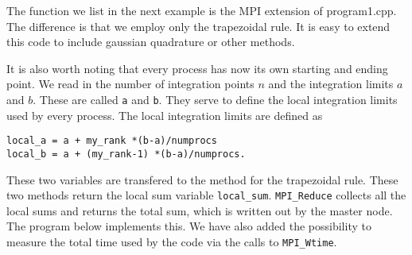 The function we list in the next example is the MPI extension of program1.cpp.  The difference is that we employ only the trapezoidal
rule. It is easy to extend this code to include gaussian quadrature or other methods.

It is also worth noting that every process has now its own starting and ending point. 
We read in the number of integration points $n$ and the integration limits $a$ and $b$. These are called
\lstinline{a} and \lstinline{b}.
They serve to define the local integration limits used by every process. The local integration limits are
defined as 
\begin{lstlisting}
local_a = a + my_rank *(b-a)/numprocs
local_b = a + (my_rank-1) *(b-a)/numprocs.
\end{lstlisting}
These two variables are transfered to the method for the trapezoidal rule.  These two methods
return the local sum variable \lstinline{local_sum}. \lstinline{MPI_Reduce} collects all the local sums and returns the total sum,
which is written out by the master node.  The program below implements this.  We have also added the possibility to
measure the total time used by the code via the calls to \lstinline{MPI_Wtime}. 
\lstset{language=c++}
